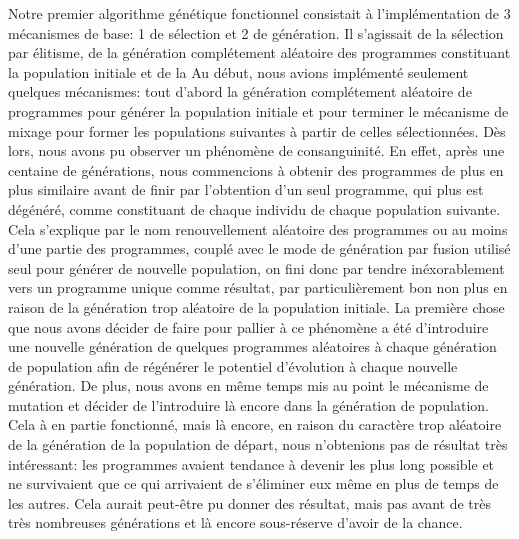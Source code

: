 \documentclass[a4paper,12pt]{article} %
\begin{document}
Notre premier algorithme génétique fonctionnel consistait à l'implémentation de 3 mécanismes de base: 1 de sélection et 2 de génération. Il s'agissait de la sélection par élitisme, de la génération complétement aléatoire des programmes constituant la population initiale et de la
Au début, nous avions implémenté seulement quelques mécanismes: tout d'abord la génération complétement aléatoire de programmes pour générer la population initiale et pour terminer le mécanisme de mixage pour former les populations suivantes à partir de celles sélectionnées. 
Dès lors, nous avons pu observer un phénomène de consanguinité. En effet, après une centaine de générations, nous commencions à obtenir des programmes de plus en plus similaire avant de finir par l'obtention d'un seul programme, qui plus est dégénéré, comme constituant de chaque individu de chaque population suivante. Cela s'explique par le nom renouvellement aléatoire des programmes ou au moins d'une partie des programmes, couplé avec le mode de génération par fusion utilisé seul pour générer de nouvelle population, on fini donc par tendre inéxorablement vers un programme unique comme résultat, par particulièrement bon non plus en raison de la génération trop aléatoire de la population initiale. 
La première chose que nous avons décider de faire pour pallier à ce phénomène a été d'introduire une nouvelle génération de quelques programmes aléatoires à chaque génération de population afin de régénérer le potentiel d'évolution à chaque nouvelle génération. De plus, nous avons en même temps mis au point le mécanisme de mutation et décider de l'introduire là encore dans la génération de population.
Cela à en partie fonctionné, mais là encore, en raison du caractère trop aléatoire de la génération de la population de départ, nous n'obtenions pas de résultat très intéressant: les programmes avaient tendance à devenir les plus long possible et ne survivaient que ce qui arrivaient de s'éliminer eux même en plus de temps de les autres. Cela aurait peut-être pu donner des résultat, mais pas avant de très très nombreuses générations et là encore sous-réserve d'avoir de la chance.
\end{document}
